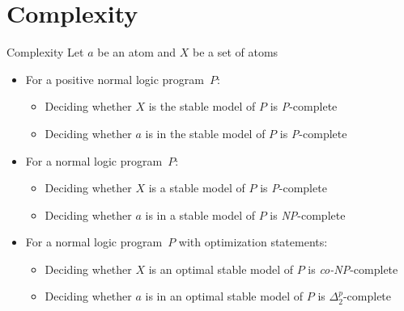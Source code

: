 \section{Complexity}
\begin{frame}{Complexity}
\smallskip
Let $a$ be an atom and $X$ be a set of atoms
\medskip
\begin{itemize}
\item<2-> For a positive normal logic program~$P$:
  \begin{itemize}
  \item Deciding whether $X$ is the stable model of $P$ is
    \textit{P}-complete
  \item Deciding whether $a$ is in the stable model of $P$ is
    \textit{P}-complete
  \end{itemize}
\item<3-> For a normal logic program~$P$:
  \begin{itemize}
  \item Deciding whether $X$ is a stable model of $P$ is
    \textit{P}-complete
  \item Deciding whether $a$ is in a stable model of $P$ is
    \textit{NP}-complete
  \end{itemize}
\item<4-> For a normal logic program~$P$ with optimization statements:
  \begin{itemize}
  \item Deciding whether $X$ is an optimal stable model of $P$ is
    \textit{co-NP}-complete
  \item Deciding whether $a$ is in an optimal stable model of $P$ is
    $\Delta^p_2$-complete
  \end{itemize}
\end{itemize}
\end{frame}
